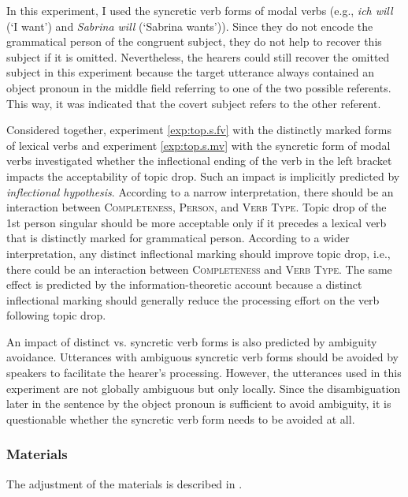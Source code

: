 In this experiment, I used the syncretic  verb forms of modal verbs (e.g., \textit{ich will} (`I want') and \textit{Sabrina will} (`Sabrina wants')).
Since they do not encode the grammatical person of the congruent subject, they do not help to recover  this subject if it is omitted.
Nevertheless, the hearers could still recover  the omitted subject in this experiment because the target utterance always contained an object pronoun in the middle field referring to one of the two possible referents.
This way, it was indicated that the covert subject refers to the other referent.

Considered together, experiment \ref*{exp:top.s.fv} with the distinctly marked forms of lexical verbs  and experiment \ref*{exp:top.s.mv} with the syncretic  form of modal verbs investigated whether the inflectional ending of the verb in the left bracket impacts the acceptability of topic drop.
Such an impact is implicitly predicted by  \textit{inflectional hypothesis}.
According to a narrow interpretation, there should be an interaction between \textsc{Completeness}, \textsc{Person}, and \textsc{Verb Type}.
Topic drop of the 1st person singular should be more acceptable only if it precedes a lexical verb  that is distinctly marked for grammatical person. 
According to a wider interpretation, any distinct inflectional marking should improve topic drop, i.e., there could be an interaction between \textsc{Completeness} and \textsc{Verb Type}.
The same effect is predicted by the information-theoretic account because a distinct inflectional marking should generally reduce the processing effort  on the verb following topic drop.

An impact of distinct vs. syncretic  verb forms is also predicted by ambiguity avoidance. 
Utterances with ambiguous  syncretic verb forms should be avoided by speakers to facilitate the hearer's processing. 
However, the utterances used in this experiment are not globally ambiguous  but only locally.
Since the disambiguation later in the sentence by the object pronoun is sufficient to avoid ambiguity,  it is questionable whether the syncretic  verb form needs to be avoided at all.

\subsubsection{Materials}
The adjustment of the materials is described in .

